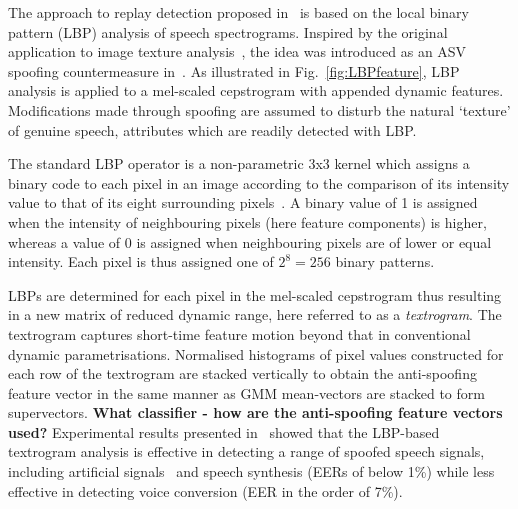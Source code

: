 The approach to replay detection proposed in~\cite{Alegre2014} is based on the local binary pattern (LBP) analysis of speech spectrograms.  
Inspired by the original application to image texture analysis~\cite{Ojala2002}, the idea was introduced as an ASV spoofing countermeasure in~\cite{Alegre2013a}.  
As illustrated in Fig.~\ref{fig:LBPfeature}, LBP analysis is applied to a mel-scaled cepstrogram with appended dynamic features.  Modifications made through spoofing are assumed to disturb the natural `texture' of genuine speech, attributes which are readily detected with LBP.   

The standard LBP operator is a non-parametric 3x3 kernel which assigns a binary code to each pixel in an image according to the comparison of its intensity value to that of its eight surrounding pixels~\cite{Ojala2002}. 
A binary value of 1 is assigned when the intensity of neighbouring pixels (here feature components) is higher, whereas a value of 0 is assigned when neighbouring pixels are of lower or equal intensity. Each pixel is thus assigned one of $2^8=256$ binary patterns.

LBPs are determined for each pixel in the mel-scaled cepstrogram thus resulting in a new matrix of reduced dynamic range, here referred to as a \emph{textrogram}.  
The textrogram captures short-time feature motion beyond that in conventional dynamic parametrisations.  
Normalised histograms of pixel values constructed for each row of the textrogram   are stacked vertically to obtain the anti-spoofing feature vector in the same manner as GMM mean-vectors are stacked to form supervectors.  
{\bfseries What classifier - how are the anti-spoofing feature vectors used?}
Experimental results presented in~\cite{Alegre2013a} showed that the LBP-based textrogram analysis is effective in detecting a range of spoofed speech signals, including artificial signals~\cite{Alegre2012a,Alegre2012b} and speech synthesis (EERs of below 1\%) while less effective in detecting voice conversion (EER in the order of 7\%).




